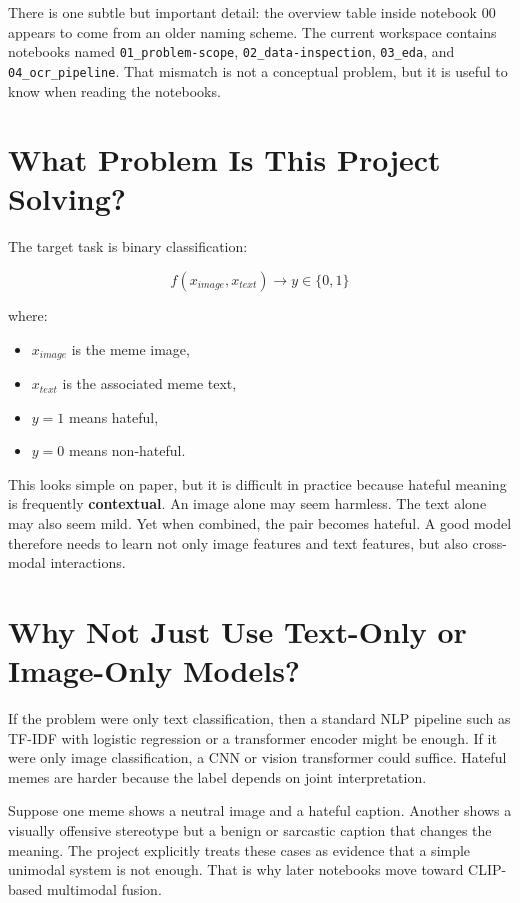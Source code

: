 \documentclass[11pt,a4paper]{report}
\begin{document}
There is one subtle but important detail: the overview table inside notebook 00 appears to come from an older naming scheme. The current workspace contains notebooks named \texttt{01\_problem-scope}, \texttt{02\_data-inspection}, \texttt{03\_eda}, and \texttt{04\_ocr\_pipeline}. That mismatch is not a conceptual problem, but it is useful to know when reading the notebooks.

\section{What Problem Is This Project Solving?}

The target task is binary classification:

\[
f(x_{image}, x_{text}) \rightarrow y \in \{0, 1\}
\]

where:

\begin{itemize}
\item $x_{image}$ is the meme image,
\item $x_{text}$ is the associated meme text,
\item $y = 1$ means hateful,
\item $y = 0$ means non-hateful.
\end{itemize}

This looks simple on paper, but it is difficult in practice because hateful meaning is frequently \textbf{contextual}. An image alone may seem harmless. The text alone may also seem mild. Yet when combined, the pair becomes hateful. A good model therefore needs to learn not only image features and text features, but also cross-modal interactions.

\section{Why Not Just Use Text-Only or Image-Only Models?}

If the problem were only text classification, then a standard NLP pipeline such as TF-IDF with logistic regression or a transformer encoder might be enough. If it were only image classification, a CNN or vision transformer could suffice. Hateful memes are harder because the label depends on joint interpretation.

Suppose one meme shows a neutral image and a hateful caption. Another shows a visually offensive stereotype but a benign or sarcastic caption that changes the meaning. The project explicitly treats these cases as evidence that a simple unimodal system is not enough. That is why later notebooks move toward CLIP-based multimodal fusion.
\end{document}
